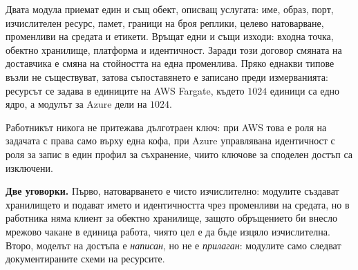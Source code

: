 Двата модула приемат един и същ обект, описващ услугата: име, образ, порт, изчислителен ресурс,
памет, граници на броя реплики, целево натоварване, променливи на средата и етикети. Връщат едни и
същи изходи: входна точка, обектно хранилище, платформа и идентичност. Заради този договор смяната
на доставчика е смяна на стойността на една променлива. Пряко еднакви типове възли
не съществуват, затова съпоставянето е записано преди измерванията: ресурсът се задава в единиците
на AWS Fargate, където $1024$ единици са едно ядро, а модулът за Azure дели на $1024$.

Работникът никога не притежава дълготраен ключ: при AWS това е роля на задачата с права само върху
една кофа, при Azure управлявана идентичност с роля за запис в един профил за съхранение, чиито
ключове за споделен достъп са изключени.

\textbf{Две уговорки.} Първо, натоварването е чисто изчислително: модулите създават хранилището и
подават името и идентичността чрез променливи на средата, но в работника няма клиент за обектно
хранилище, защото обръщението би внесло мрежово чакане в единица работа, чиято цел е да бъде
изцяло изчислителна. Второ, моделът на достъпа е \emph{написан}, но не е \emph{прилаган}: модулите
само следват документираните схеми на ресурсите.
